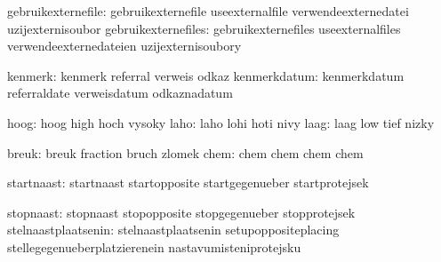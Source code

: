            gebruikexternefile:  gebruikexternefile           useexternalfile
                                verwendeexternedatei         uzijexternisoubor
          gebruikexternefiles:  gebruikexternefiles          useexternalfiles
                                verwendeexternedateien       uzijexternisoubory

                      kenmerk:  kenmerk                      referral
                                verweis                      odkaz
                 kenmerkdatum:  kenmerkdatum                 referraldate
                                verweisdatum                 odkaznadatum

                         hoog:  hoog                         high
                                hoch                         vysoky
                         laho:  laho                         lohi
                                hoti                         nivy
                         laag:  laag                         low
                                tief                         nizky


                        breuk:  breuk                        fraction
                                bruch                        zlomek
                         chem:  chem                         chem
                                chem                         chem

                   startnaast:  startnaast                   startopposite
                                startgegenueber              startprotejsek

                    stopnaast:  stopnaast                    stopopposite
                                stopgegenueber               stopprotejsek
          stelnaastplaatsenin:  stelnaastplaatsenin          setupoppositeplacing
                                stellegegenueberplatzierenein nastavumisteniprotejsku


